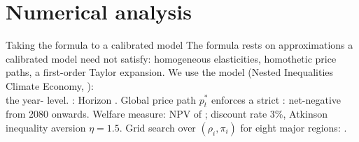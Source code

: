 \documentclass[aspectratio=169,xcolor=dvipsnames, 11pt,mathserif]{beamer}
\begin{document}
\section{Numerical analysis}

\begin{frame}{Taking the formula to a calibrated model\label{nice}}
\bbvsp
\ip The formula rests on approximations a calibrated model need not satisfy: homogeneous elasticities, homothetic price paths, %
a first-order Taylor expansion. %
\ip We use the model  (Nested Inequalities Climate Economy, ): \\  the year- level.
\ip {}:
  \bbvsp
  \ip Horizon . Global price path $p_t^*$ enforces a strict : net-negative from 2080 onwards.
  \ip Welfare measure: NPV of ; discount rate 3\%, Atkinson inequality aversion $\eta=1.5$.
  \ip Grid search over $(\rho_i,\pi_i)$ for eight major regions: .
  \ee
\ee
\end{frame}
\end{document}
